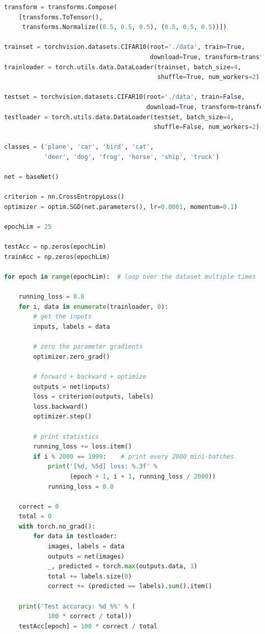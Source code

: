 \documentclass{article}
\newcommand{\1}{\mathbf{1}}
\begin{document}
\begin{lstlisting}[language=Python]
transform = transforms.Compose(
    [transforms.ToTensor(),
     transforms.Normalize((0.5, 0.5, 0.5), (0.5, 0.5, 0.5))])

trainset = torchvision.datasets.CIFAR10(root='./data', train=True,
                                        download=True, transform=transform)
trainloader = torch.utils.data.DataLoader(trainset, batch_size=4,
                                          shuffle=True, num_workers=2)

testset = torchvision.datasets.CIFAR10(root='./data', train=False,
                                       download=True, transform=transform)
testloader = torch.utils.data.DataLoader(testset, batch_size=4,
                                         shuffle=False, num_workers=2)

classes = ('plane', 'car', 'bird', 'cat',
           'deer', 'dog', 'frog', 'horse', 'ship', 'truck')

net = baseNet()

criterion = nn.CrossEntropyLoss()
optimizer = optim.SGD(net.parameters(), lr=0.0001, momentum=0.1)

epochLim = 25

testAcc = np.zeros(epochLim)
trainAcc = np.zeros(epochLim)

for epoch in range(epochLim):  # loop over the dataset multiple times

    running_loss = 0.0
    for i, data in enumerate(trainloader, 0):
        # get the inputs
        inputs, labels = data

        # zero the parameter gradients
        optimizer.zero_grad()

        # forward + backward + optimize
        outputs = net(inputs)
        loss = criterion(outputs, labels)
        loss.backward()
        optimizer.step()

        # print statistics
        running_loss += loss.item()
        if i % 2000 == 1999:    # print every 2000 mini-batches
            print('[%d, %5d] loss: %.3f' %
                  (epoch + 1, i + 1, running_loss / 2000))
            running_loss = 0.0

    correct = 0
    total = 0
    with torch.no_grad():
        for data in testloader:
            images, labels = data
            outputs = net(images)
            _, predicted = torch.max(outputs.data, 1)
            total += labels.size(0)
            correct += (predicted == labels).sum().item()

    print('Test accuracy: %d %%' % (
            100 * correct / total))
    testAcc[epoch] = 100 * correct / total


\end{lstlisting}
\end{document}
